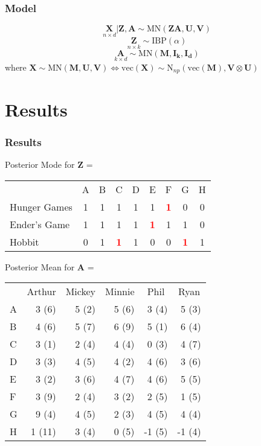 \documentclass{beamer}
\def\wl{\par \vspace{\baselineskip}}
\newcommand\tc[1]{\textcolor{red}{\textbf{#1}}}
\begin{document}
  \begin{frame}
  \frametitle{Model}
    \[ \underset{n \times d}{\bm X} | \bm{Z}, \bm{A} \sim \text{MN}(\bm{ZA,U,V})\]
    \[ \underset{n \times k}{\bm Z} \sim \text{IBP}(\alpha) \]
    \[ \underset{k \times d}{\bm A} \sim \text{MN}(\bm{M,I_k,I_d})\]
    where $\bm X \sim \text{MN}(\bm{M,U,V}) \iff 
          \text{vec}(\bm{X}) \sim 
          \text{N}_{np}(\text{vec}(\bm M),\bm V \otimes \bm U)$
  \end{frame}


  \section{Results}
  \begin{frame}
  \frametitle{Results}
  Posterior Mode for $\bm Z$ = 
        \begin{tabular}{l|c|c|c|c|c|c|c|c|}
         \multicolumn{1}{c}{}
           & \multicolumn{1}{c}{A} 
           & \multicolumn{1}{c}{B}
           & \multicolumn{1}{c}{C}
           & \multicolumn{1}{c}{D}
           & \multicolumn{1}{c}{E}
           & \multicolumn{1}{c}{F}
           & \multicolumn{1}{c}{G}
           & \multicolumn{1}{c}{H} \\ 
         \cline{2-9}

        Hunger Games &1&1&   1&1&   1&\tc1&   0&0 \\ \cline{2-9}
        Ender's Game &1&1&   1&1&\tc1&   1&   1&0 \\ \cline{2-9}
        Hobbit       &0&1&\tc1&1&   0&   0&\tc1&1 \\ \cline{2-9}

       \end{tabular}

  \wl
  Posterior Mean for $\bm A$ = \\ \wl
       \begin{tabular}{l|r|r|r|r|r|}
         \multicolumn{1}{c}{}
           & \multicolumn{1}{c}{Arthur} 
           & \multicolumn{1}{c}{Mickey}
           & \multicolumn{1}{c}{Minnie}
           & \multicolumn{1}{c}{Phil}
           & \multicolumn{1}{c}{Ryan} \\ 
         \cline{2-6}

         A &3  (6)&5 (2)&5 (6)&3  (4)&5  (3)\\ \cline{2-6}
         B &4  (6)&5 (7)&6 (9)&5  (1)&6  (4)\\ \cline{2-6}
         C &3  (1)&2 (4)&4 (4)&0  (3)&4  (7)\\ \cline{2-6}
         D &3  (3)&4 (5)&4 (2)&4  (6)&3  (6)\\ \cline{2-6}
         E &3  (2)&3 (6)&4 (7)&4  (6)&5  (5)\\ \cline{2-6}
         F &3  (9)&2 (4)&3 (2)&2  (5)&1  (5)\\ \cline{2-6}
         G &9  (4)&4 (5)&2 (3)&4  (5)&4  (4)\\ \cline{2-6}
         H &1 (11)&3 (4)&0 (5)&-1 (5)&-1 (4)\\ \cline{2-6}
       \end{tabular}

  \end{frame}
  
\end{document}
